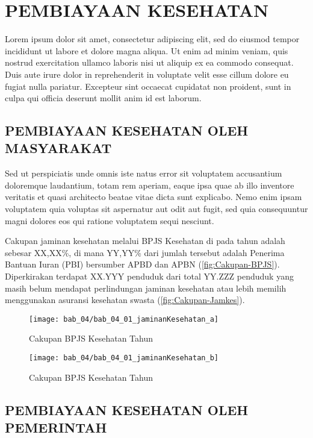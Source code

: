 \chapter{PEMBIAYAAN KESEHATAN}
Lorem ipsum dolor sit amet, consectetur adipiscing elit, sed do eiusmod tempor incididunt ut labore et dolore magna aliqua. Ut enim ad minim veniam, quis nostrud exercitation ullamco laboris nisi ut aliquip ex ea commodo consequat. Duis aute irure dolor in reprehenderit in voluptate velit esse cillum dolore eu fugiat nulla pariatur. Excepteur sint occaecat cupidatat non proident, sunt in culpa qui officia deserunt mollit anim id est laborum.

\section[PEMBIAYAAN MASYARAKAT]{PEMBIAYAAN KESEHATAN OLEH MASYARAKAT}
Sed ut perspiciatis unde omnis iste natus error sit voluptatem accusantium doloremque laudantium, totam rem aperiam, eaque ipsa quae ab illo inventore veritatis et quasi architecto beatae vitae dicta sunt explicabo. Nemo enim ipsam voluptatem quia voluptas sit aspernatur aut odit aut fugit, sed quia consequuntur magni dolores eos qui ratione voluptatem sequi nesciunt.

Cakupan jaminan kesehatan melalui BPJS Kesehatan di \namaKabupaten pada tahun \tP adalah sebesar XX,XX\%, di mana YY,YY\% dari jumlah tersebut adalah Penerima Bantuan Iuran (PBI) bersumber APBD dan APBN (\autoref{fig:Cakupan-BPJS}). Diperkirakan terdapat XX.YYY penduduk dari total YY.ZZZ penduduk yang masih belum mendapat perlindungan jaminan kesehatan atau lebih memilih menggunakan asuransi kesehatan swasta (\autoref{fig:Cakupan-Jamkes}).

\begin{figure}[H]
    \centering{}
    \texttt{[image: bab\_04/bab\_04\_01\_jaminanKesehatan\_a]}
    \caption{Cakupan BPJS Kesehatan \namaKabupaten Tahun \tP}
    \label{fig:Cakupan-BPJS}
\end{figure}

\begin{figure}[H]
    \centering{}
    \texttt{[image: bab\_04/bab\_04\_01\_jaminanKesehatan\_b]}
    \caption{Cakupan BPJS Kesehatan \namaKabupaten Tahun \tP}
    \label{fig:Cakupan-Jamkes}
\end{figure}


\section[PEMBIAYAAN PEMERINTAH]{PEMBIAYAAN KESEHATAN OLEH PEMERINTAH}
